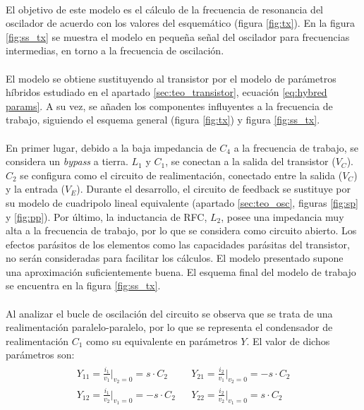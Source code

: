\paragraph{}
El objetivo de este modelo es el cálculo de la frecuencia de resonancia del oscilador de acuerdo con los valores del esquemático (figura \ref{fig:tx}). En la figura \ref{fig:ss_tx} se muestra el modelo en pequeña señal del oscilador para frecuencias intermedias, en torno a la frecuencia de oscilaci\'on.
\paragraph{}
El modelo se obtiene sustituyendo al transistor por el modelo de parámetros híbridos estudiado en el apartado \ref{sec:teo_transistor}, ecuaci\'on \ref{eq:hybred params}. A su vez, se añaden los componentes influyentes a la frecuencia de trabajo, siguiendo el esquema general (figura \ref{fig:tx}) y figura \ref{fig:ss_tx}.
\paragraph{}
En primer lugar, debido a la baja impedancia de $C_4$ a la frecuencia de trabajo, se considera un \textit{bypass} a tierra. $L_1$ y $C_1$, se conectan a la salida del transistor ($V_C$). $C_2$ se configura como el circuito de realimentaci\'on, conectado entre la salida ($V_C$) y la entrada ($V_E$). Durante el desarrollo, el circuito de feedback se sustituye por su modelo de cuadripolo lineal equivalente (apartado \ref{sec:teo_osc}, figuras \ref{fig:sp} y \ref{fig:pp}).
Por último, la inductancia de RFC, $L_2$, posee una impedancia muy alta a la frecuencia de trabajo, por lo que se considera como circuito abierto. 
Los efectos parásitos de los elementos como las capacidades parásitas del transistor, no serán consideradas para facilitar los cálculos. El modelo presentado supone una aproximación suficientemente buena. El esquema final del modelo de trabajo se encuentra en la figura \ref{fig:ss_tx}.
\paragraph{}
Al analizar el bucle de oscilaci\'on del circuito se observa que se trata de una realimentación paralelo-paralelo, por lo que se representa el condensador de realimentación $C_1$ como su equivalente en par\'ametros $Y$. El valor de dichos par\'ametros son:
\[
\begin{array}{rl} 
      \begin{array}{l}
	 Y_{11} = \frac{i_1}{v_1}|_{v_2 = 0} = s \cdot C_2 \\
	 Y_{12} = \frac{i_1}{v_2}|_{v_1 = 0} = -s \cdot C_2 
      \end{array}
      &
      \begin{array}{l}
	 Y_{21} = \frac{i_2}{v_1}|_{v_2 = 0} = -s \cdot C_2 \\
	 Y_{22} = \frac{i_2}{v_2}|_{v_1 = 0} = s \cdot C_2 
      \end{array}
\end{array}
\]
